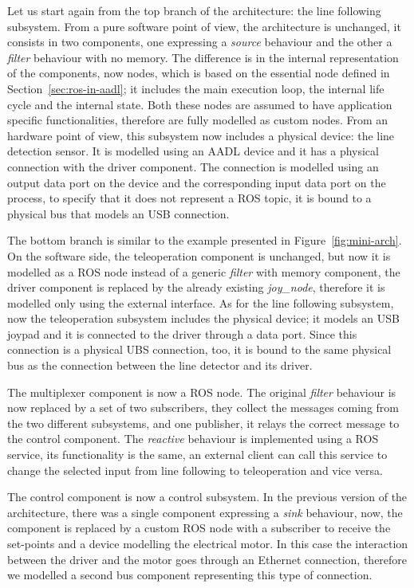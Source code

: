Let us start again from the top branch of the architecture: the line following subsystem. From a pure software point of view, the architecture is unchanged, it consists in two components, one expressing a \textit{source} behaviour and the other a \textit{filter} behaviour with no memory. The difference is in the internal representation of the components, now nodes, which is based on the essential node defined in Section~\ref{sec:ros-in-aadl}; it includes the main execution loop, the internal life cycle and the internal state. Both these nodes are assumed to have application specific functionalities, therefore are fully modelled as custom nodes. From an hardware point of view, this subsystem now includes a physical device: the line detection sensor. It is modelled using an AADL device and it has a physical connection with the driver component. The connection is modelled using an output data port on the device and the corresponding input data port on the process, to specify that it does not represent a ROS topic, it is bound to a physical bus that models an USB connection.

The bottom branch is similar to the example presented in Figure~\ref{fig:mini-arch}. On the software side, the teleoperation component is unchanged, but now it is modelled as a ROS node instead of a generic \textit{filter} with memory component, the driver component is replaced by the already existing \textit{joy\_node}, therefore it is modelled only using the external interface. As for the line following subsystem, now the teleoperation subsystem includes the physical device; it models an USB joypad and it is connected to the driver through a data port. Since this connection is a physical UBS connection, too, it is bound to the same physical bus as the connection between the line detector and its driver.

The multiplexer component is now a ROS node. The original \textit{filter} behaviour is now replaced by a set of two subscribers, they collect the messages coming from the two different subsystems, and one publisher, it relays the correct message to the control component. The \textit{reactive} behaviour is implemented using a ROS service, its functionality is the same, an external client can call this service to change the selected input from line following to teleoperation and vice versa.

The control component is now a control subsystem. In the previous version of the architecture, there was a single component expressing a \textit{sink} behaviour, now, the component is replaced by a custom ROS node with a subscriber to receive the set-points and a device modelling the electrical motor. In this case the interaction between the driver and the motor goes through an Ethernet connection, therefore we modelled a second bus component representing this type of connection.

